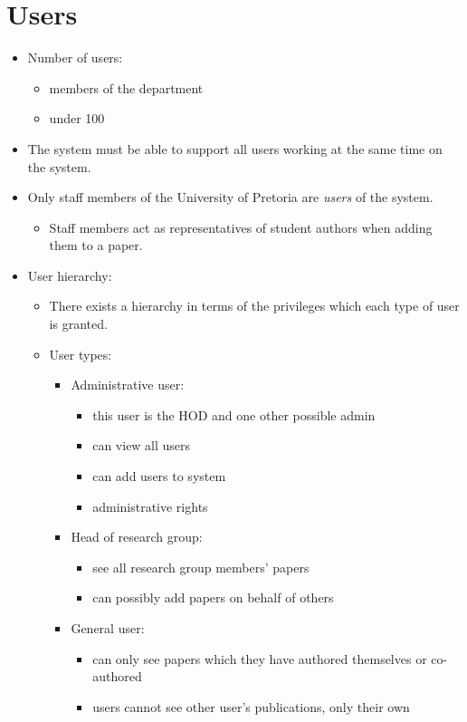 \documentclass{article}
\begin{document}
\section{Users}\label{sec:users}
	\begin{itemize}
		\item Number of users:
		\begin{itemize}
			\item members of the department
			\item under 100
		\end{itemize}
		\item The system must be able to support all users working at the same time on the system.
		\item Only staff members of the University of Pretoria are \textit{users} of the system.
		\begin{itemize}
			\item Staff members act as representatives of student authors when adding them to a paper.
		\end{itemize}
		\item User hierarchy:
		\begin{itemize}
			\item There exists a hierarchy in terms of the privileges which each type of user is granted.
			\item User types:
			\begin{itemize}
				\item Administrative user:
				\begin{itemize}
					\item this user is the HOD and one other possible admin
					\item can view all users
					\item can add users to system
					\item administrative rights
				\end{itemize}
				\item Head of research group:
				\begin{itemize}
					\item see all research group members' papers
					\item can possibly add papers on behalf of others
				\end{itemize}
				\item General user:
				\begin{itemize}
					\item can only see papers which they have authored themselves or co-authored
					\item users cannot see other user's publications, only their own
				\end{itemize}
			\end{itemize}
			
		\end{itemize}
	\end{itemize}
\end{document}
